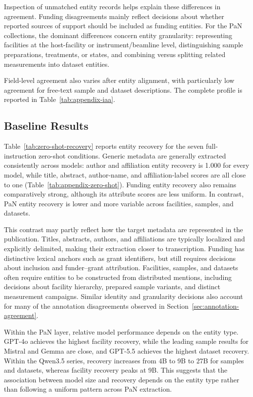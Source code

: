 

Inspection of unmatched entity records helps explain these differences in
agreement. Funding disagreements mainly reflect decisions about 
whether reported sources of support should be included as funding entities. 
For the PaN collections, the dominant differences concern entity granularity:
representing facilities at the host-facility or instrument/beamline level,
distinguishing sample preparations, treatments, or states, and combining
versus splitting related measurements into dataset entities.

Field-level agreement also varies after entity alignment, with particularly
low agreement for free-text sample and dataset descriptions. The complete
profile is reported in Table~\ref{tab:appendix-iaa}.



\subsection{Baseline Results}
\label{sec:baseline-results}

Table~\ref{tab:zero-shot-recovery} reports entity recovery for the seven
full-instruction zero-shot conditions.
Generic metadata are generally extracted consistently across models: author and
affiliation entity recovery is 1.000 for every model, while title, abstract,
author-name, and affiliation-label scores are all close to one
(Table~\ref{tab:appendix-zero-shot}). Funding entity recovery also remains
comparatively strong, although its attribute scores are less uniform. In
contrast, PaN entity recovery is lower and more variable across facilities,
samples, and datasets.

This contrast may partly reflect how the target metadata are represented in
the publication. Titles, abstracts, authors, and affiliations are typically
localized and explicitly delimited, making their extraction closer to
transcription. Funding has distinctive lexical anchors such as grant
identifiers, but still requires decisions about inclusion and funder--grant
attribution. Facilities, samples, and datasets often require entities to
be constructed from distributed mentions, including decisions about facility
hierarchy, prepared sample variants, and distinct measurement campaigns.
Similar identity and granularity decisions also account for many of the
annotation disagreements observed in
Section~\ref{sec:annotation-agreement}. 

Within the PaN layer, relative model performance depends on the entity type.
GPT-4o achieves the highest facility recovery, while the leading
sample results for Mistral and Gemma are close, and GPT-5.5
achieves the highest dataset recovery. Within the Qwen3.5 series, recovery
increases from 4B to 9B to 27B for samples and datasets, whereas facility 
recovery peaks at 9B. This suggests that the association between model size 
and recovery depends on the entity type rather than following a uniform pattern 
across PaN extraction.


